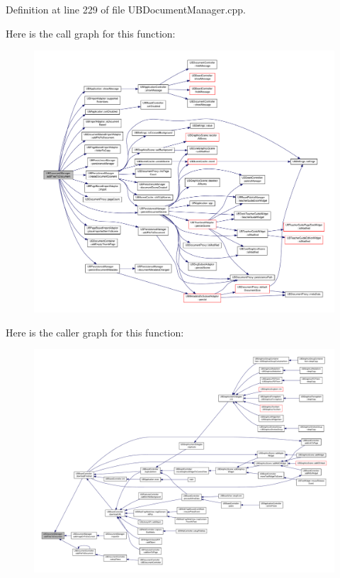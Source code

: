 Definition at line 229 of file U\-B\-Document\-Manager.\-cpp.



Here is the call graph for this function\-:
\nopagebreak
\begin{figure}[H]
\begin{center}
\leavevmode
\includegraphics[width=350pt]{d2/da1/class_u_b_document_manager_abd34b528df41737caedf2dd6e0661dd7_cgraph}
\end{center}
\end{figure}




Here is the caller graph for this function\-:
\nopagebreak
\begin{figure}[H]
\begin{center}
\leavevmode
\includegraphics[width=350pt]{d2/da1/class_u_b_document_manager_abd34b528df41737caedf2dd6e0661dd7_icgraph}
\end{center}
\end{figure}


